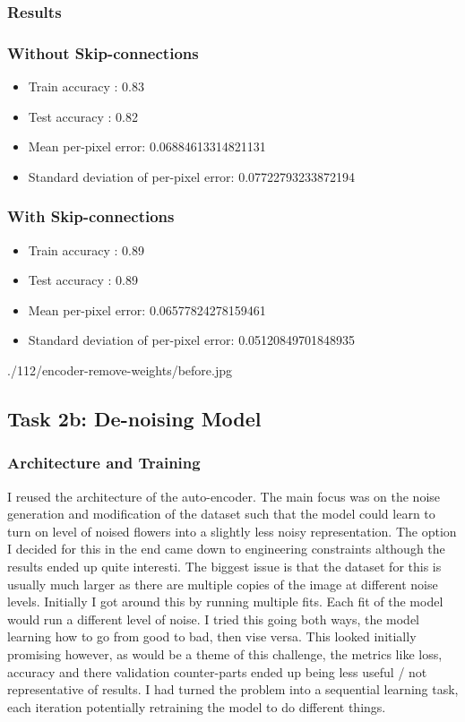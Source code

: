 \documentclass[12pt]{article}
\begin{document}
\subsubsection{Results}

\subsubsection{Without Skip-connections}
\begin{itemize}
    \item   Train accuracy : 0.83
    \item   Test accuracy  : 0.82
    \item   Mean per-pixel error: 0.06884613314821131
    \item   Standard deviation of per-pixel error: 0.07722793233872194
\end{itemize}


\subsubsection{With Skip-connections}
\begin{itemize}
    \item   Train accuracy : 0.89
    \item   Test accuracy  : 0.89
    \item   Mean per-pixel error: 0.06577824278159461
    \item   Standard deviation of per-pixel error: 0.05120849701848935
\end{itemize}
./112/encoder-remove-weights/before.jpg

\subsection{Task 2b: De-noising Model}
\subsubsection{Architecture and Training}

I reused the architecture of the auto-encoder. The main focus was on the noise generation and modification of the dataset such that the model could learn to turn on level of
noised flowers into a slightly less noisy representation. The option I decided for this in the end came down to engineering constraints although the results ended up quite interesti.
The biggest issue is that the dataset for this is usually much larger as there are multiple copies of the image at different noise levels. Initially I got around this by running multiple
fits. Each fit of the model would run a different level of noise. I tried this going both ways, the model learning how to go from good to bad, then vise versa. This looked initially promising
however, as would be a theme of this challenge, the metrics like loss, accuracy and there validation counter-parts ended up being less useful / not representative of results. I had turned
the problem into a sequential learning task, each iteration potentially retraining the model to do different things. 
\end{document}

